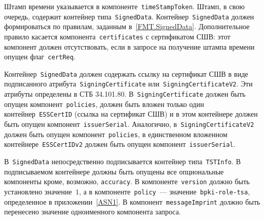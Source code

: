 Штамп времени указывается в компоненте~\texttt{timeStampToken}. Штамп, в 
свою очередь, содержит контейнер типа~\texttt{SignedData}.
%
Контейнер~\texttt{SignedData} должен формироваться по правилам,
заданным в~\ref{FMT.SignedData}. Дополнительное правило  
касается компонента~\texttt{certificates} с сертификатом СШВ:
этот компонент должен отсутствовать, если в запросе на получение штампа 
времени опущен флаг~\texttt{certReq}.

Контейнер~\texttt{SignedData} должен содержать ссылку на сертификат СШВ
в виде подписанного атрибута~\texttt{SigningCertificate} 
или~\texttt{SigningCertificateV2}. Эти атрибуты определены в СТБ 
34.101.80.  
%
В~\texttt{SigningCertificate} должен быть опущен 
компонент~\texttt{policies}, должен быть вложен только один 
контейнер~\texttt{ESSCertID} (ссылка на сертификат СШВ) и в этом 
контейнере должен быть опущен компонент~\texttt{issuerSerial}.
%
Аналогично, в~\texttt{SigningCertificateV2} должен быть опущен 
компонент~\texttt{policies}, в единственном вложенном 
контейнере~\texttt{ESSCertIDv2} должен быть опущен 
компонент~\texttt{issuerSerial}.

В~\texttt{SignedData} непосредственно подписывается 
контейнер типа~\texttt{TSTInfo}. 
%
В подписываемом контейнере должны быть опущены все опциональные компоненты 
кроме, возможно, \texttt{accuracy}. 
%
В компоненте~\texttt{version} должно быть установлено значение~$1$,
а в компоненте~\texttt{policy}~--- значение~\texttt{bpki-role-tsa},
определенное в приложении~\ref{ASN1}.
%
В компонент~\texttt{messageImprint} должно быть перенесено
значение одноименного компонента запроса.


